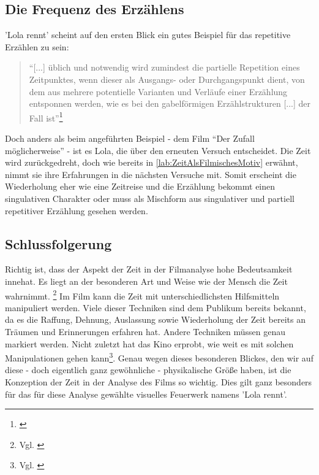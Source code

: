 \subsection{Die Frequenz des Erzählens}

'Lola rennt' scheint auf den ersten Blick ein gutes Beispiel für das repetitive Erzählen zu sein:
\begin{quote}"`[...] üblich und
notwendig wird zumindest die partielle Repetition eines Zeitpunktes, wenn dieser als Ausgangs- oder Durchgangspunkt dient, von dem aus mehrere potentielle Varianten und Verläufe einer Erzählung entsponnen werden, wie es bei den gabelförmigen Erzählstrukturen
[...] der Fall ist"'\footnote{\cite[S. 216]{keutzer2014filmanalyse}}\end{quote}
Doch anders als beim angeführten Beispiel - dem Film "`Der Zufall möglicherweise"' - ist es Lola, die über den erneuten Versuch entscheidet. Die Zeit wird zurückgedreht, doch wie bereits in \ref{lab:ZeitAlsFilmischesMotiv} erwähnt, nimmt sie ihre Erfahrungen in die nächsten Versuche mit. Somit erscheint die Wiederholung eher wie eine Zeitreise und die Erzählung bekommt einen singulativen Charakter oder muss als Mischform aus singulativer und partiell repetitiver Erzählung gesehen werden.

\subsection{Schlussfolgerung}

Richtig ist, dass der Aspekt der Zeit in der Filmanalyse hohe Bedeutsamkeit innehat. Es liegt an der besonderen Art und Weise wie der Mensch die Zeit wahrnimmt. \footnote{Vgl. \cite[S. 204]{keutzer2014filmanalyse}} Im Film kann die Zeit mit unterschiedlichsten Hilfsmitteln manipuliert werden. Viele dieser Techniken sind dem Publikum bereits bekannt, da es die Raffung, Dehnung, Auslassung sowie Wiederholung der Zeit bereits an Träumen und Erinnerungen erfahren hat. Andere Techniken müssen genau markiert werden. Nicht zuletzt hat das Kino erprobt, wie weit es mit solchen Manipulationen gehen kann\footnote{Vgl. \cite[S. 216]{keutzer2014filmanalyse}}. Genau wegen dieses besonderen Blickes, den wir auf diese - doch eigentlich ganz gewöhnliche - physikalische Größe haben, ist die Konzeption der Zeit in der Analyse des Films so wichtig. Dies gilt ganz besonders für das für diese Analyse gewählte visuelles Feuerwerk namens 'Lola rennt'.


%

